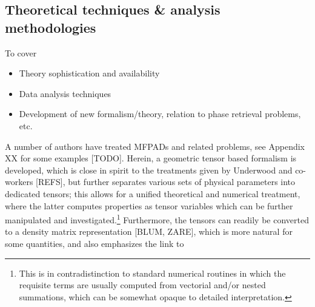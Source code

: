\subsection{Theoretical techniques \& analysis methodologies}

To cover 

\begin{itemize}
\item Theory sophistication and availability
\item Data analysis techniques
\item Development of new formalism/theory, relation to phase retrieval problems, etc.
\end{itemize}

A number of authors have treated MFPADs and related problems, see Appendix XX for some examples [TODO]. Herein, a geometric tensor based formalism is developed, which is close in spirit to the treatments given by Underwood and co-workers [REFS], but further separates various sets of physical parameters into dedicated tensors; this allows for a unified theoretical and numerical treatment, where the latter computes properties as tensor variables which can be further manipulated and investigated.\footnote{This is in contradistinction to standard numerical routines in which the requisite terms are usually computed from vectorial and/or nested summations, which can be somewhat opaque to detailed interpretation.} Furthermore, the tensors can readily be converted to a density matrix representation [BLUM, ZARE], which is more natural for some quantities, and also emphasizes the link to 